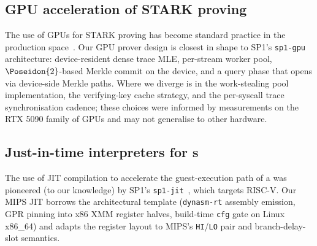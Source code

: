 \subsection{GPU acceleration of STARK proving}

The use of GPUs for STARK proving has become standard practice in the production \zkVM{} space~\citep{sp1-gpu}. Our GPU prover design is closest in shape to SP1's \texttt{sp1-gpu} architecture: device-resident dense trace MLE, per-stream worker pool, $\Poseidon{2}$-based Merkle commit on the device, and a query phase that opens via device-side Merkle paths. Where we diverge is in the work-stealing pool implementation, the verifying-key cache strategy, and the per-syscall trace synchronisation cadence; these choices were informed by measurements on the RTX 5090 family of GPUs and may not generalise to other hardware.

\subsection{Just-in-time interpreters for \zkVM s}

The use of JIT compilation to accelerate the guest-execution path of a \zkVM{} was pioneered (to our knowledge) by SP1's \texttt{sp1-jit}~\citep{sp1-jit}, which targets RISC-V. Our MIPS JIT borrows the architectural template (\texttt{dynasm-rt} assembly emission, GPR pinning into x86 XMM register halves, build-time \texttt{cfg} gate on Linux x86\_64) and adapts the register layout to MIPS's \texttt{HI}/\texttt{LO} pair and branch-delay-slot semantics.
